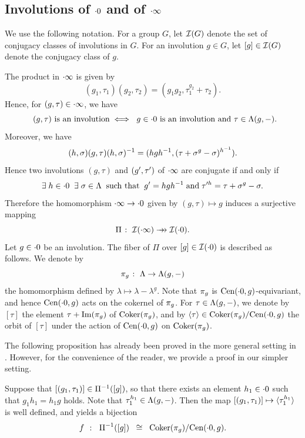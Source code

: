\documentclass{amsart} %
\begin{document}
\subsection{Involutions of $\cdot 0$ and of $\cdot \infty$}\label{subsec:zinf}
%
We use the following notation.
For a group $G$, let $\mathord{\mathcal{I}}(G)$ denote the set of conjugacy classes of involutions in $G$.
For an involution $g\in G$, let $[g]\in \mathord{\mathcal{I}}(G)$ denote the conjugacy class of $g$.
\par
The product in $\cdot \infty$ is given by 
\[
(g_1, \tau_1)(g_2, \tau_2)=(g_1g_2, \tau_1^{g_2}+\tau_2).
\]
Hence, for $(g, \tau)\in \cdot \infty$, we have 
%
\begin{equation}\label{eq:gtauisinvoliff}
\textrm{\;\;$(g, \tau)$ is an involution}
\;\Longleftrightarrow\;
\textrm{
$g\in \cdot 0$ is an involution and $\tau\in \Lambda(g, -)$}.
\end{equation}
%
Moreover, we have 
%
\begin{equation}\label{eq:hsgthsinv}
(h, \sigma)(g, \tau)(h, \sigma)^{-1}
=(hgh^{-1}, (\tau+\sigma^g-\sigma)^{h^{-1}}).
\end{equation}
%
Hence 
two involutions $(g, \tau)$ and $(g^{\prime}, \tau^{\prime})$ of $\cdot \infty$ are conjugate if and only if
%
\begin{equation}\label{eq:conjiff}
\exists\; h\in \cdot 0 \;\;
\exists\; \sigma\in \Lambda \;\;
\textrm{such that} \;\;
g^{\prime}=h g h^{-1}
\;\textrm{and}\; \tau\sp{\prime h}=\tau+\sigma^{g}-\sigma.
\end{equation}
%
Therefore the homomorphism $\cdot \infty \to \cdot 0$ given by $(g, \tau)\mapsto g$
induces a surjective mapping
\[
\Pi\;\colon\; \mathord{\mathcal{I}}(\cdot \infty)\mathrel{\rightarrow\!\!\!\!\rightarrow} \mathord{\mathcal{I}}(\cdot 0).
\]
Let $g\in \cdot 0$ be an involution.
The fiber of $\Pi$ over $[g]\in\mathord{\mathcal{I}}(\cdot 0)$ is described as follows.
We denote by 
\[
\pi_{g}\;\colon\; \Lambda \to \Lambda (g, -)
\]
the homomorphism defined by $\lambda\mapsto \lambda-\lambda^g$.
Note that $\pi_{g}$ is $\mathrm{Cen}(\cdot 0, g)$-equivariant,
and hence $\mathrm{Cen}(\cdot 0, g)$ acts on the cokernel of $\pi_{g}$.
For $\tau\in \Lambda (g, -)$, 
we denote by $[\tau]$ the element $\tau+\operatorname{Im}(\pi_{g})$ of $\operatorname{Coker}(\pi_{g})$,
and by $\langle {\tau} \rangle\in \operatorname{Coker}(\pi_{g})/\mathrm{Cen}(\cdot 0, g)$ the orbit of
$[\tau]$ under the action of $\mathrm{Cen}(\cdot 0, g)$ on $ \operatorname{Coker}(\pi_{g})$.
%
\par
The following proposition has already been proved in the more general setting in \cite[Lemma 4.13]{MR4931809}. 
However, for the convenience of the reader, we provide a proof in our simpler setting.
%
\begin{proposition}\label{prop:bijf}
Suppose that $[(g_1, \tau_1)]\in \Pi^{-1}([g])$,
so that there exists an element $h_1\in \cdot 0$
such that $g_1h_1=h_1 g $ holds.
Note that $\tau_1\sp{h_1}\in \Lambda(g, -)$.
Then the map
$[(g_1, \tau_1)] \mapsto \langle {\tau_1\sp{h_1}} \rangle$ 
is well defined, and 
yields a bijection 
%
\begin{equation}\label{eq:Piinvg}
f\;\;\colon\;\; \Pi^{-1}([g])\;\;\cong\;\; \operatorname{Coker}(\pi_{g})/\mathrm{Cen}(\cdot 0, g).
\end{equation}
%
\end{proposition}
\end{document}
